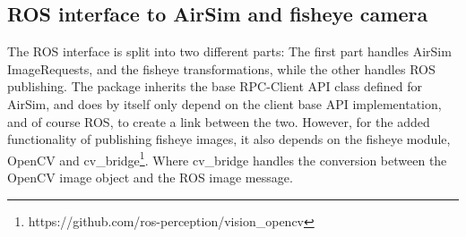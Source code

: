 

        
        

\subsection{ROS interface to AirSim and fisheye camera}\label{subsec:ROS_interface}

The ROS interface is split into two different parts: The first part handles AirSim ImageRequests, and the fisheye transformations, while the other handles ROS publishing. The package inherits the base RPC-Client API class defined for AirSim, and does by itself only depend on the client base API implementation, and of course ROS, to create a link between the two. However, for the added functionality of publishing fisheye images, it also depends on the fisheye module, OpenCV and cv\_bridge\footnote{https://github.com/ros-perception/vision\_opencv}. Where cv\_bridge handles the conversion between the OpenCV image object and the ROS image message.


